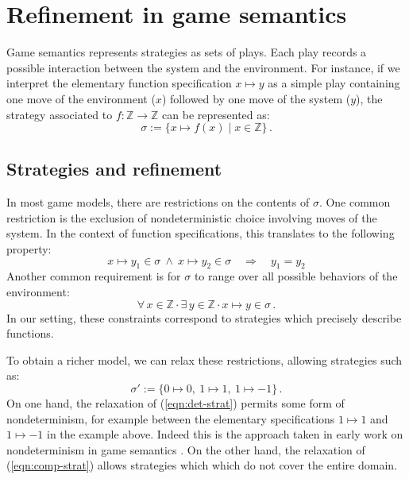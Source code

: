 \documentclass[11pt,oneside]{book}
\theoremstyle{definition}
\newcommand{\bdot}{\boldsymbol{\cdot}}
\begin{document}
\section{Refinement in game semantics} \label{sec:refgs} %

Game semantics represents strategies as sets of plays.
Each play records a possible interaction between
the system and the environment.
For instance,
if we interpret the elementary function specification
$x \mapsto y$
as a simple play
containing one move of the environment ($x$)
followed by one move of the system ($y$),
the strategy associated to $f : \mathbb{Z} \rightarrow \mathbb{Z}$
can be represented as:
\[
  \sigma := \{ x \mapsto f(x) \mid x \in \mathbb{Z} \}
  \,.
\]

\subsection{Strategies and refinement} %

In most game models,
there are restrictions on the contents of $\sigma$.
One common restriction is
the exclusion of nondeterministic choice
involving moves of the system.
In the context of function specifications,
this translates to the following property:
\begin{equation}
  x \mapsto y_1 \in \sigma \: \wedge \: x \mapsto y_2 \in \sigma
  \quad \Rightarrow \quad
  y_1 = y_2
  \label{eqn:det-strat}
\end{equation}
Another common requirement is
for $\sigma$ to range over all possible behaviors of the environment:
\begin{equation}
  \forall \, x \in \mathbb{Z} \, \bdot \,
  \exists \, y \in \mathbb{Z} \, \bdot \,
  x \mapsto y \in \sigma
  \,.
  \label{eqn:comp-strat}
\end{equation}
In our setting,
these constraints correspond to
strategies which precisely describe functions.

To obtain a richer model,
we can relax these restrictions,
allowing strategies such as:
\[
  \sigma' :=
  \{ 0 \mapsto 0, \: 1 \mapsto 1 , \: 1 \mapsto -1 \}
  \,.
\]
On one hand,
the relaxation of (\ref{eqn:det-strat})
permits some form of nondeterminism,
for example between the elementary specifications
$1 \mapsto 1$ and $1 \mapsto -1$
in the example above.
Indeed this is the approach taken in early work
on nondeterminism in game semantics \citep{gsfnd}.
On the other hand,
the relaxation of (\ref{eqn:comp-strat})
allows strategies which which do not
cover the entire domain.
\end{document}
